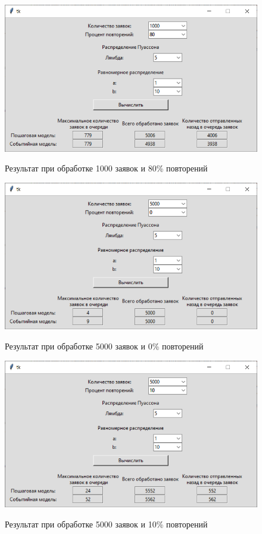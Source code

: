 \documentclass[12pt,a4paper,oneside]{report}
\begin{document}
\begin{figure}[!h]
	\centering
	\includegraphics[scale=0.7]{1_4.png}
	\label{fig:screenshot004}
	\caption{Результат при обработке 1000 заявок и 80\% повторений}
\end{figure}
\clearpage

\begin{figure}[!h]
	\centering
	\includegraphics[scale=0.7]{2_1.png}
	\label{fig:screenshot005}
	\caption{Результат при обработке 5000 заявок и 0\% повторений}
\end{figure}

\begin{figure}[!h]
	\centering
	\includegraphics[scale=0.7]{2_2.png}
	\label{fig:screenshot006}
	\caption{Результат при обработке 5000 заявок и 10\% повторений}
\end{figure}
\end{document}
